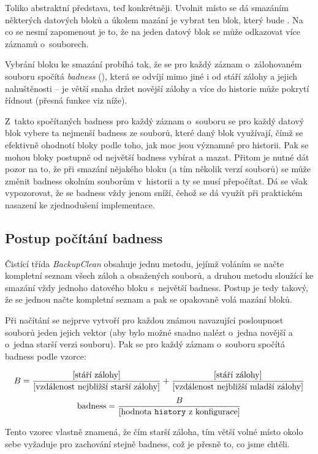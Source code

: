 Toliko abstraktní představa, teď konkrétněji. Uvolnit místo se dá smazáním
některých datových bloků a úkolem mazání je vybrat ten blok, který bude
. Na co se nesmí zapomenout je to, že na jeden datový blok
se může odkazovat více záznamů o~souborech.

Vybrání bloku ke smazání probíhá tak, že se pro každý záznam o~zálohovaném
souboru spočítá {\it badness} (), která se odvíjí mimo jiné
i od stáří zálohy a jejich nahuštěnosti -- je větší snaha držet novější zálohy
a více do historie může pokrytí řídnout (přesná funkce viz níže).

Z~takto spočítaných badness pro každý záznam o~souboru se pro každý datový
blok vybere ta nejmenší badness ze souborů, které daný blok využívají, čímž se
efektivně ohodnotí bloky podle toho, jak moc jsou významné pro historii. Pak se
mohou bloky postupně od největší badness vybírat a mazat. Přitom je nutné dát
pozor na to, že při smazání nějakého bloku (a tím několik verzí souborů) se
může změnit badness okolním souborům v~historii a ty se musí přepočítat. Dá se
však vypozorovat, že se badness vždy jenom sníží, čehož se dá využít při
praktickém nasazení ke zjednodušení implementace.

\subsection{Postup počítání badness}

Čistící třída {\it BackupClean} obsahuje jednu metodu, jejímž voláním se načte
kompletní seznam všech záloh a obsažených souborů, a druhou metodu sloužící ke
smazání vždy jednoho datového bloku s~největší badness. Postup je tedy takový,
že se jednou načte kompletní seznam a pak se opakovaně volá mazání bloků.

Při načítání se nejprve vytvoří pro každou známou navazující posloupnost souborů
jeden jejich vektor (aby bylo možné snadno nalézt o~jedna novější a o~jedna
starší verzi souboru). Pak se pro každý záznam o~souboru spočítá badness podle
vzorce:

$$B = {[\hbox{stáří zálohy}]\over[\hbox{vzdálenost nejbližší starší zálohy}]}
+{[\hbox{stáří zálohy}]\over[\hbox{vzdálenost nejbližší mladší zálohy}]}$$
$$\hbox{badness} = {B\over[\hbox{hodnota \texttt{history} z konfigurace}]}$$

Tento vzorec vlastně znamená, že čím starší záloha, tím větší volné místo okolo
sebe vyžaduje pro zachování stejně badness, což je přesně to, co jsme chtěli.

